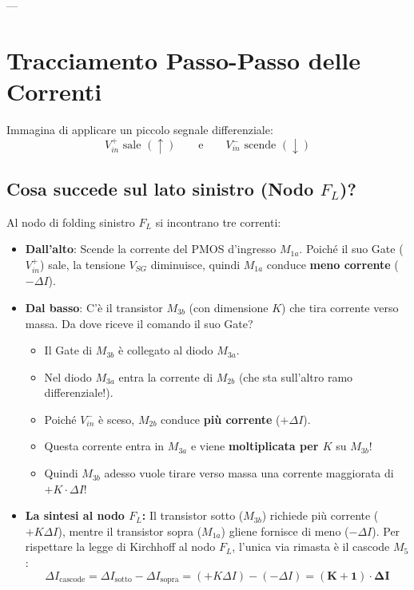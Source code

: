 \documentclass[11pt,a4paper]{article}
\begin{document}
---

\newpage
\section{Tracciamento Passo-Passo delle Correnti}

Immagina di applicare un piccolo segnale differenziale:
$$V_{in}^+ \text{ sale } (\uparrow) \qquad \text{e} \qquad V_{in}^- \text{ scende } (\downarrow)$$

\subsection*{Cosa succede sul lato sinistro (Nodo $F_L$)?}
Al nodo di folding sinistro $F_L$ si incontrano tre correnti:
\begin{itemize}
    \item \textbf{Dall'alto}: Scende la corrente del PMOS d'ingresso $M_{1a}$. Poiché il suo Gate ($V_{in}^+$) sale, la tensione $V_{SG}$ diminuisce, quindi $M_{1a}$ conduce \textbf{meno corrente} ($-\Delta I$).
    \item \textbf{Dal basso}: C'è il transistor $M_{3b}$ (con dimensione $K$) che tira corrente verso massa. Da dove riceve il comando il suo Gate?
    \begin{itemize}
        \item Il Gate di $M_{3b}$ è collegato al diodo $M_{3a}$.
        \item Nel diodo $M_{3a}$ entra la corrente di $M_{2b}$ (che sta sull'altro ramo differenziale!).
        \item Poiché $V_{in}^-$ è sceso, $M_{2b}$ conduce \textbf{più corrente} ($+\Delta I$).
        \item Questa corrente entra in $M_{3a}$ e viene \textbf{moltiplicata per $K$} su $M_{3b}$!
        \item Quindi $M_{3b}$ adesso vuole tirare verso massa una corrente maggiorata di \textbf{$+K \cdot \Delta I$}!
    \end{itemize}
    \item \textbf{La sintesi al nodo $F_L$:}
    Il transistor sotto ($M_{3b}$) richiede più corrente ($+K\Delta I$), mentre il transistor sopra ($M_{1a}$) gliene fornisce di meno ($-\Delta I$).  
    Per rispettare la legge di Kirchhoff al nodo $F_L$, l'unica via rimasta è il cascode $M_5$:
    $$\Delta I_{\text{cascode}} = \Delta I_{\text{sotto}} - \Delta I_{\text{sopra}} = (+K \Delta I) - (-\Delta I) = \mathbf{(K + 1) \cdot \Delta I}$$
\end{itemize}
\end{document}

